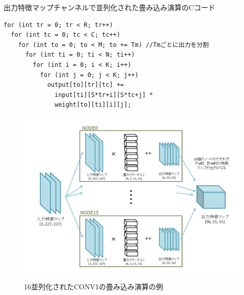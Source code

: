 \begin{itembox}[1]{出力特徴マップチャンネルで並列化された畳み込み演算のCコード}
\begin{verbatim}
for (int tr = 0; tr < R; tr++)
  for (int tc = 0; tc < C; tc++)
    for (int to = 0; to < M; to += Tm) //Tmごとに出力を分割
      for (int ti = 0; ti < N; ti++)
        for (int i = 0; i < K; i++)
          for (int j = 0; j < K; j++)
            output[to][tr][tc] +=
              input[ti][S*tr+i][S*tc+j] *
              weight[to][ti][i][j];
\end{verbatim}
\end{itembox}
						
						
\begin{figure}[ht]  
 \begin{center}   
	\includegraphics[width=1.0\columnwidth,bb=0 0 720 540]{img/paraconv.png}
  \caption{16並列化されたCONV1の畳み込み演算の例}
  \label{fig_paraconv}  
 \end{center}  
\end{figure}

